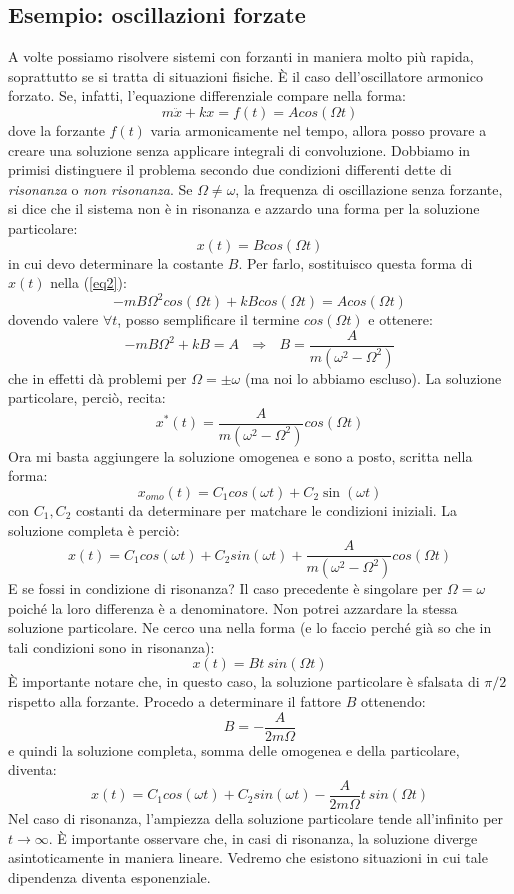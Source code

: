 \documentclass[a4paper,openany]{article}
\begin{document}
	\subsection{Esempio: oscillazioni forzate}
	A volte possiamo risolvere sistemi con forzanti in maniera molto più rapida, soprattutto se si tratta di situazioni fisiche. È il caso dell'oscillatore armonico forzato. Se, infatti, l'equazione differenziale compare nella forma: 
	\begin{equation}
		m\ddot{x} + kx = f(t) = Acos(\Omega t)
		\label{eq2}
	\end{equation}
	dove la forzante $f(t)$ varia armonicamente nel tempo, allora posso provare a creare una soluzione senza applicare integrali di convoluzione. Dobbiamo in primisi distinguere il problema secondo due condizioni differenti dette di \textit{risonanza} o \textit{non risonanza}. Se $\Omega \neq \omega$, la frequenza di oscillazione senza forzante, si dice che il sistema non è in risonanza e azzardo una forma per la soluzione particolare:
	$$
	x(t) = Bcos(\Omega t)
	$$
	in cui devo determinare la costante $B$. Per farlo, sostituisco questa forma di $x(t)$ nella (\ref{eq2}):
	$$
	-mB \Omega^{2}cos(\Omega t) + kBcos(\Omega t) = Acos(\Omega t)
	$$
	dovendo valere $\forall t$, posso semplificare il termine $cos(\Omega t)$ e ottenere:
	$$
	-mB \Omega^{2} + kB = A \>\>\> \Longrightarrow \>\>\> B = \dfrac{A}{m(\omega^{2}-\Omega^{2})}
	$$
	che in effetti dà problemi per $\Omega = \pm \omega$ (ma noi lo abbiamo escluso). La soluzione particolare, perciò, recita:
	$$
	x^{*}(t) = \dfrac{A}{m(\omega^{2}-\Omega^{2})}cos(\Omega t)
	$$
	Ora mi basta aggiungere la soluzione omogenea e sono a posto, scritta nella forma:
	$$
	x_{omo}(t) = C_{1}cos(\omega t) + C_{2}\sin(\omega t) 
	$$
	con $C_{1}, C_{2}$ costanti da determinare per matchare le condizioni iniziali. La soluzione completa è perciò:
	$$
	x(t) =  C_{1}cos(\omega t) + C_{2}sin(\omega t) + \dfrac{A}{m(\omega^{2}-\Omega^{2})}cos(\Omega t)
	$$
	E se fossi in condizione di risonanza? Il caso precedente è singolare per $\Omega = \omega$ poiché la loro differenza è a denominatore. Non potrei azzardare la stessa soluzione particolare. Ne cerco una nella forma (e lo faccio perché già so che in tali condizioni sono in risonanza):
	$$
	x(t) = Bt\>sin(\Omega t)
	$$
	È importante notare che, in questo caso, la soluzione particolare è sfalsata di $\pi/2$ rispetto alla forzante. Procedo a determinare il fattore $B$ ottenendo:
	$$
	B = -\dfrac{A}{2m\Omega }
	$$
	e quindi la soluzione completa, somma delle omogenea e della particolare, diventa:
	$$
	x(t) = C_{1}cos(\omega t) + C_{2}sin(\omega t) -\dfrac{A}{2m\Omega }t\>sin(\Omega t)
	$$
	Nel caso di risonanza, l'ampiezza della soluzione particolare tende all'infinito per $t\to\infty$. È importante osservare che, in casi di risonanza, la soluzione diverge asintoticamente in maniera lineare. Vedremo che esistono situazioni in cui tale dipendenza diventa esponenziale.
	
\end{document}
